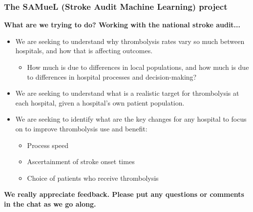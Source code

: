\begin{frame}
\frametitle{The SAMueL (Stroke Audit Machine Learning) project}

\textbf{What are we trying to do? Working with the national stroke audit...}
\vspace{2mm}

\begin{itemize} 

\setlength{\itemsep}{1mm}

\item We are seeking to understand why thrombolysis rates vary so much between hospitals, and how that is affecting outcomes. 
    \vspace{1mm}
    \begin{itemize} 
    \item How much is due to differences in local populations, and how much is due to differences in hospital processes and decision-making?
    \end{itemize}

\item We are seeking to understand what is a realistic target for thrombolysis at each hospital, given a hospital's own patient population.

\item We are seeking to identify what are the key changes for any hospital to focus on to improve thrombolysis use and benefit:

    \begin{itemize}
    \vspace{1mm}
        \item Process speed
        \item Ascertainment of stroke onset times
        \item Choice of patients who receive thrombolysis
    \end{itemize}
        
\end{itemize}

\vspace{2mm}
\color{purple}
\textbf{We really appreciate feedback. Please put any questions or comments in the chat as we go along.}

\end{frame}